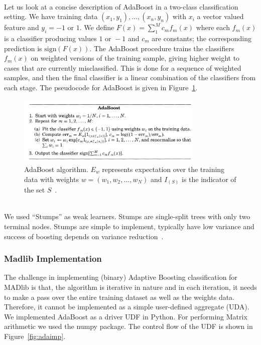 ~~\\
Let us look at a concise description of AdaBoost in a two-class classification setting. We have training data $(x_1, y_1), \ldots, (x_n, y_n)$ with $x_i$ a vector valued feature and $y_i = -1\text{ or }1$. We define $F(x) = \sum_1^M{c_mf_m(x)}$ where each $f_m(x)$ is a classifier producing values $1\text{ or }-1$ and $c_m$ are constants; the corresponding prediction is $\text{sign}(F(x))$. The AdaBoost procedure trains the classifiers $f_m(x)$ on weighted versions of the training sample, giving higher weight to cases that are currently misclassified. This is done for a sequence of weighted samples, and then the final classifier is a linear combination of the classifiers from each stage. The pseudocode for AdaBoost is given in Figure~\ref{fig:adaproc}.

\begin{figure}[ht]
\centering
\includegraphics[width=0.8\textwidth]{ada.png}
\caption{AdaBoost algorithm. $E_w$ represents expectation over the training data with weights $w=(w_1,w_2,\ldots,w_N)$ and $I_{(S)}$ is the indicator of the set $S$~\cite{alr00}.}
\label{fig:adaproc}
\end{figure}

~~\\
We used ``Stumps'' as weak learners. Stumps are single-split trees with only two terminal nodes. Stumps are simple to implement, typically have low variance and success of boosting depends on variance reduction~\cite{alr00}.

\subsubsection{Madlib Implementation}
The challenge in implementing (binary) Adaptive Boosting classification for MADlib is that, the algorithm is iterative in nature and in each iteration, it needs to make a pass over the entire training dataset as well as the weights data. Therefore, it cannot be implemented as a simple user-defined aggregate (UDA). We implemented AdaBoost as a driver UDF in Python. For performing Matrix arithmetic we used the {\ttfamily numpy} package. The control flow of the UDF is shown in Figure~\ref{fig:adaimp}.

